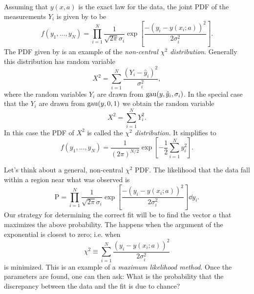 Assuming that $y(x,a)$ is the exact law for the data, the joint PDF
of the measurements $Y_i$ is given by  to be
\begin{equation}\label{eq:chi2NC}
  f(y_1,...,y_N)=\prod_{i=1}^N\frac{1}{\sqrt{2\pi}\sigma_i}
      \exp\left[\frac{-(y_i-y(x_i;a))^2}{2\sigma_i^2}\right].
\end{equation}
The PDF given by  is an example of the 
{\it non-central $\chi^2$ distribution}. Generally this distribution
has random variable
\begin{equation}
  X^2=\sum_{i=1}^N\frac{(Y_i-\hat{y}_i)^2}{\sigma_i^2},
\end{equation}
where the random variables $Y_i$ are drawn from $\operatorname{gau}(y,\hat{y}_i,\sigma_i)$. 
In the special case that the $Y_i$ are drawn from $\operatorname{gau}(y,0,1)$ we
obtain the random variable
\begin{equation}
  X^2=\sum\limits_{i=1}^NY_i^2.
\end{equation}
In this case the PDF of $X^2$ is called the {\it $\chi^2$ distribution}. 
 It simplifies to 
\begin{equation}\label{eq:chi2dist}
  f(y_1,...,y_N)=\frac{1}{(2\pi)^{N/2}}
      \exp\left[-\frac{1}{2}\sum_{i=1}^Ny_i^2\right].
\end{equation}

Let's think about a general, non-central $\chi^2$ PDF. The likelihood that the
data fall within a region near what was observed is 
\begin{equation}
  \text{P}=\prod_{i=1}^N\frac{1}{\sqrt{2\pi}\sigma_i}
      \exp\left[\frac{-(y_i-y(x_i;a))^2}{2\sigma_i^2}\right]\dd{y_i}.
\end{equation}
Our strategy for determining the correct fit will be to find the vector $a$
that maximizes the above probability. The happens when the argument
of the exponential is closest to zero; i.e. when
\begin{equation}
  \chi^2\equiv\sum_{i=1}^N\frac{(y_i-y(x_i;a))^2}{2\sigma_i^2}
\end{equation}
is minimized. This is an example of a {\it maximum likelihood method}.
Once the parameters are found, one can then ask: What is the probability
that the discrepancy between the data and the fit is due to chance? 

